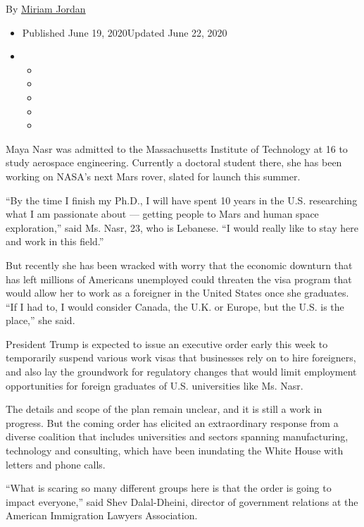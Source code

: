 By \href{https://www.nytimes3xbfgragh.onion/by/miriam-jordan/}{Miriam
Jordan}

\begin{itemize}
\item
  Published June 19, 2020Updated June 22, 2020
\item
  \begin{itemize}
  \item
  \item
  \item
  \item
  \item
  \end{itemize}
\end{itemize}

Maya Nasr was admitted to the Massachusetts Institute of Technology at
16 to study aerospace engineering. Currently a doctoral student there,
she has been working on NASA's next Mars rover, slated for launch this
summer.

``By the time I finish my Ph.D., I will have spent 10 years in the U.S.
researching what I am passionate about --- getting people to Mars and
human space exploration,'' said Ms. Nasr, 23, who is Lebanese. ``I would
really like to stay here and work in this field.''

But recently she has been wracked with worry that the economic downturn
that has left millions of Americans unemployed could threaten the visa
program that would allow her to work as a foreigner in the United States
once she graduates. ``If I had to, I would consider Canada, the U.K. or
Europe, but the U.S. is the place,'' she said.

President Trump is expected to issue an executive order early this week
to temporarily suspend various work visas that businesses rely on to
hire foreigners, and also lay the groundwork for regulatory changes that
would limit employment opportunities for foreign graduates of U.S.
universities like Ms. Nasr.

The details and scope of the plan remain unclear, and it is still a work
in progress. But the coming order has elicited an extraordinary response
from a diverse coalition that includes universities and sectors spanning
manufacturing, technology and consulting, which have been inundating the
White House with letters and phone calls.

``What is scaring so many different groups here is that the order is
going to impact everyone,'' said Shev Dalal-Dheini, director of
government relations at the American Immigration Lawyers Association.

